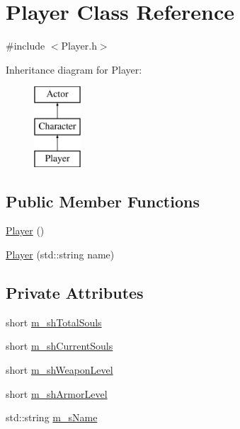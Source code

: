 \hypertarget{class_player}{\section{Player Class Reference}
\label{class_player}
}


{\ttfamily \#include $<$Player.\-h$>$}

Inheritance diagram for Player\-:\begin{figure}[H]
\begin{center}
\leavevmode
\includegraphics[height=3.000000cm]{class_player}
\end{center}
\end{figure}
\subsection*{Public Member Functions}
\begin{DoxyCompactItemize}
\item 
\hyperlink{class_player_affe0cc3cb714f6deb4e62f0c0d3f1fd8}{Player} ()
\item 
\hyperlink{class_player_af5aaea393030f959d568c806ca9100ca}{Player} (std\-::string name)
\end{DoxyCompactItemize}
\subsection*{Private Attributes}
\begin{DoxyCompactItemize}
\item 
short \hyperlink{class_player_a9ff033e2fbc16cd9eec507c0832cf1fa}{m\-\_\-sh\-Total\-Souls}
\item 
short \hyperlink{class_player_ac15acaec6575cc6ef5681aa3f8a23555}{m\-\_\-sh\-Current\-Souls}
\item 
short \hyperlink{class_player_aa4a137aee416bc314036eb2ec51e125a}{m\-\_\-sh\-Weapon\-Level}
\item 
short \hyperlink{class_player_aa495c787dc9c8f3861775efe6ab4c082}{m\-\_\-sh\-Armor\-Level}
\item 
std\-::string \hyperlink{class_player_a55507be1f64e7ba369b502b8fd3a12dd}{m\-\_\-s\-Name}
\end{DoxyCompactItemize}
